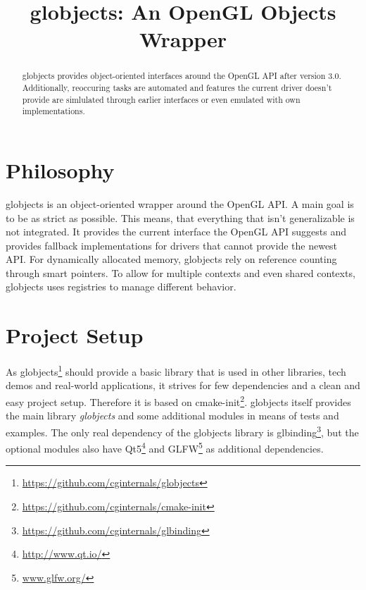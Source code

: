 \documentclass{article}
\begin{document}
\title{globjects: An OpenGL Objects Wrapper}

\maketitle

\begin{abstract}
\noindent
globjects provides object-oriented interfaces around the OpenGL API after version 3.0. Additionally, reoccuring tasks are automated and features the current driver doesn't provide are simlulated through earlier interfaces or even emulated with own implementations.

\end{abstract}

\setcounter{tocdepth}{2}
\tableofcontents

\newpage

\section{Philosophy}

globjects is an object-oriented wrapper around the OpenGL API. A main goal is to be as strict as possible. This means, that everything that isn't generalizable is not integrated. It provides the current interface the OpenGL API suggests and provides fallback implementations for drivers that cannot provide the newest API. For dynamically allocated memory, globjects rely on reference counting through smart pointers. To allow for multiple contexts and even shared contexts, globjects uses registries to manage different behavior.

\section{Project Setup}

As globjects\footnote{\url{https://github.com/cginternals/globjects}} should provide a basic library that is used in other libraries, tech demos and real-world applications, it strives for few dependencies and a clean and easy project setup.
Therefore it is based on cmake-init\footnote{\url{https://github.com/cginternals/cmake-init}}.
globjects itself provides the main library \emph{globjects} and some additional modules in means of tests and examples. The only real dependency of the globjects library is glbinding\footnote{\url{https://github.com/cginternals/glbinding}}, but the optional modules also have Qt5\footnote{\url{http://www.qt.io/}} and GLFW\footnote{\url{www.glfw.org/}} as additional dependencies.
\end{document}
